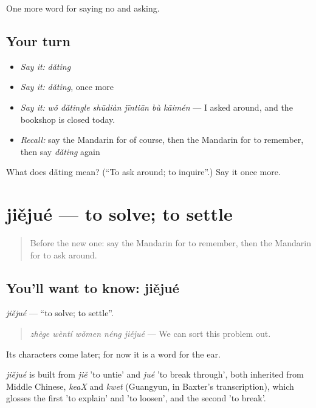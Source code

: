 \begin{grammarlens}[title={What you've built}]
One more word for saying no and asking.
\end{grammarlens}

\subsection*{Your turn}
\begin{itemize}
\raggedright
  \item \emph{Say it:} \emph{dǎting}
  \item \emph{Say it:} \emph{dǎting}, once more
  \item \emph{Say it:} \emph{wǒ dǎtingle shūdiàn jīntiān bù kāimén} — I asked around, and the bookshop is closed today.
  \item \emph{Recall:} say the Mandarin for of course, then the Mandarin for to remember, then say \emph{dǎting} again
\end{itemize}

\begin{tcolorbox}[breakable,colback=teal!4,colframe=teal!35!black,title={Before you move on}]
What does dǎting mean? (\textquotedblleft{}To ask around; to inquire\textquotedblright{}.) Say it once more.
\end{tcolorbox}
\section[jiějué]{jiějué — to solve; to settle}

\label{lesson:ZH-C217-jiejue}



\begin{quote}
Before the new one: say the Mandarin for to remember, then the Mandarin for to ask around.
\end{quote}

\subsection*{You'll want to know: jiějué}
\emph{jiějué} — \textquotedblleft{}to solve; to settle\textquotedblright{}.

\begin{quote}
\emph{zhège wèntí wǒmen néng jiějué} — We can sort this problem out.
\end{quote}

Its characters come later; for now it is a word for the ear.

\begin{cousinweb}
\emph{jiějué} is built from \emph{jiě} 'to untie' and \emph{jué} 'to break through', both inherited from Middle Chinese, \emph{keaX} and \emph{kwet} (Guangyun, in Baxter's transcription), which glosses the first 'to explain' and 'to loosen', and the second 'to break'.
\end{cousinweb}

